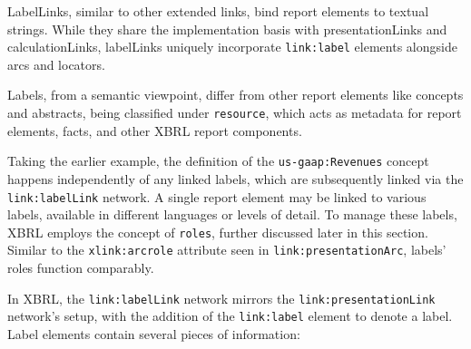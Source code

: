 

LabelLinks, similar to other extended links, bind report elements to textual strings.
While they share the implementation basis with presentationLinks and calculationLinks, labelLinks uniquely incorporate \texttt{link:label} elements alongside arcs and locators.

Labels, from a semantic viewpoint, differ from other report elements like concepts and abstracts,
being classified under \texttt{resource}, which acts as metadata for report elements, facts, and other XBRL report components.

Taking the earlier example, the definition of the \texttt{us-gaap:Revenues} concept happens independently of any linked labels,
which are subsequently linked via the \texttt{link:labelLink} network.
A single report element may be linked to various labels, available in different languages or levels of detail.
To manage these labels, XBRL employs the concept of \texttt{roles}, further discussed later in this section.
Similar to the \texttt{xlink:arcrole} attribute seen in \texttt{link:presentationArc}, labels' roles function comparably.

In XBRL, the \texttt{link:labelLink} network mirrors the \texttt{link:presentationLink} network's setup,
with the addition of the \texttt{link:label} element to denote a label.
Label elements contain several pieces of information:

